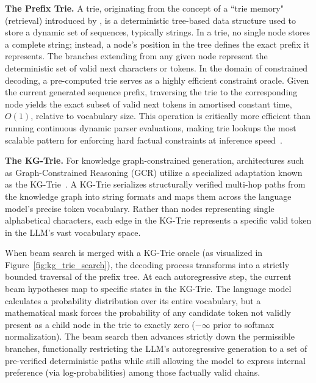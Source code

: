 \textbf{The Prefix Trie.} A trie, originating from the concept of a ``trie memory" (retrieval) introduced by \citet{fredkin1960trie}, is a deterministic tree-based data structure used to store a dynamic set of sequences, typically strings. In a trie, no single node stores a complete string; instead, a node's position in the tree defines the exact prefix it represents. The branches extending from any given node represent the deterministic set of valid next characters or tokens. In the domain of constrained decoding, a pre-computed trie serves as a highly efficient constraint oracle. Given the current generated sequence prefix, traversing the trie to the corresponding node yields the exact subset of valid next tokens in amortised constant time, $O(1)$, relative to vocabulary size. This operation is critically more efficient than running continuous dynamic parser evaluations, making trie lookups the most scalable pattern for enforcing hard factual constraints at inference speed~\citep{willard2023outlines}.

\textbf{The KG-Trie.} For knowledge graph-constrained generation, architectures such as Graph-Constrained Reasoning (GCR) utilize a specialized adaptation known as the KG-Trie~\citep{luo2024gcr}. A KG-Trie serializes structurally verified multi-hop paths from the knowledge graph into string formats and maps them across the language model's precise token vocabulary. Rather than nodes representing single alphabetical characters, each edge in the KG-Trie represents a specific valid token in the LLM's vast vocabulary space.

When beam search is merged with a KG-Trie oracle (as visualized in Figure~\ref{fig:kg_trie_search}), the decoding process transforms into a strictly bounded traversal of the prefix tree. At each autoregressive step, the current beam hypotheses map to specific states in the KG-Trie. The language model calculates a probability distribution over its entire vocabulary, but a mathematical mask forces the probability of any candidate token not validly present as a child node in the trie to exactly zero ($-\infty$ prior to softmax normalization). The beam search then advances strictly down the permissible branches, functionally restricting the LLM's autoregressive generation to a set of pre-verified deterministic paths while still allowing the model to express internal preference (via log-probabilities) among those factually valid chains.

